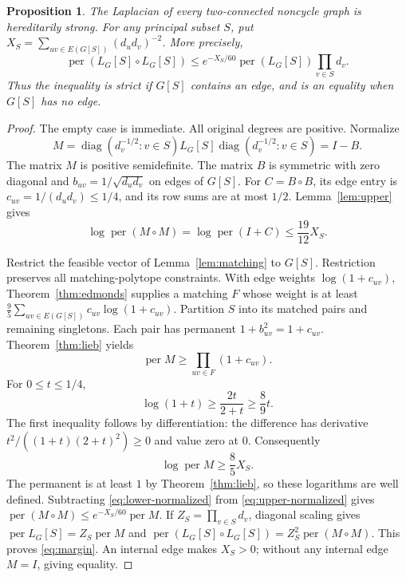 \documentclass[11pt]{article}
\newtheorem{proposition}[theorem]{Proposition}
\theoremstyle{remark}\newtheorem{remark}[theorem]{Remark}
\DeclareMathOperator{\per}{per}
\begin{document}
\begin{proposition}\label{prop:block}
The Laplacian of every two-connected noncycle graph is hereditarily strong.
For any principal subset $S$, put
$X_S=\sum_{uv\in E(G[S])}(d_ud_v)^{-2}$. More precisely,
\begin{equation}\label{eq:margin}
\per(L_G[S]\circ L_G[S])
\le e^{-X_S/60}\per(L_G[S])\prod_{v\in S}d_v.
\end{equation}
Thus the inequality is strict if $G[S]$ contains an edge, and is an
equality when $G[S]$ has no edge.
\end{proposition}
\begin{proof}
The empty case is immediate. All original degrees are positive. Normalize
\[
M=\operatorname{diag}(d_v^{-1/2}:v\in S)L_G[S]
\operatorname{diag}(d_v^{-1/2}:v\in S)=I-B.
\]
The matrix $M$ is positive semidefinite. The matrix $B$ is symmetric
with zero diagonal and $b_{uv}=1/\sqrt{d_ud_v}$ on edges of $G[S]$.
For $C=B\circ B$, its edge entry is $c_{uv}=1/(d_ud_v)\le1/4$,
and its row sums are at most $1/2$. Lemma~\ref{lem:upper} gives
\begin{equation}\label{eq:upper-normalized}
\log\per(M\circ M)=\log\per(I+C)\le\frac{19}{12}X_S.
\end{equation}

Restrict the feasible vector of Lemma~\ref{lem:matching} to $G[S]$.
Restriction preserves all matching-polytope constraints. With edge
weights $\log(1+c_{uv})$, Theorem~\ref{thm:edmonds} supplies a matching
$F$ whose weight is at least
$\frac95\sum_{uv\in E(G[S])}c_{uv}\log(1+c_{uv})$.
Partition $S$ into its matched pairs and remaining singletons. Each pair
has permanent $1+b_{uv}^2=1+c_{uv}$. Theorem~\ref{thm:lieb} yields
\[
\per M\ge\prod_{uv\in F}(1+c_{uv}).
\]
For $0\le t\le1/4$,
\[
\log(1+t)\ge\frac{2t}{2+t}\ge\frac89t.
\]
The first inequality follows by differentiation: the difference has
derivative $t^2/((1+t)(2+t)^2)\ge0$ and value zero at $0$.
Consequently
\begin{equation}\label{eq:lower-normalized}
\log\per M\ge\frac85X_S.
\end{equation}
The permanent is at least $1$ by Theorem~\ref{thm:lieb}, so these
logarithms are well defined. Subtracting
\eqref{eq:lower-normalized} from \eqref{eq:upper-normalized} gives
$\per(M\circ M)\le e^{-X_S/60}\per M$.
If $Z_S=\prod_{v\in S}d_v$, diagonal scaling gives
$\per L_G[S]=Z_S\per M$ and
$\per(L_G[S]\circ L_G[S])=Z_S^2\per(M\circ M)$.
This proves \eqref{eq:margin}. An internal edge makes $X_S>0$;
without any internal edge $M=I$, giving equality.
\end{proof}
\end{document}
